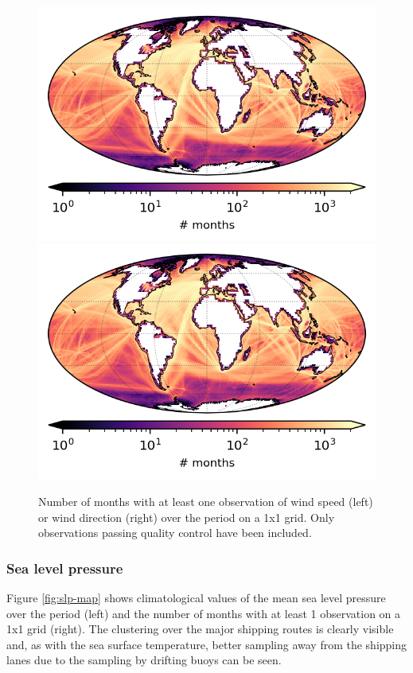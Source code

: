 \begin{figure}[h]
    \centering
    \includegraphics{resources/observations-ws-months-map-optimal.png}
    \includegraphics{resources/observations-wd-months-map-optimal.png}
    \caption{Number of months with at least one observation of wind speed (left) or wind direction (right) over the period \datatimerange{} on a 1x1 grid. Only observations passing quality control have been included.\\}
    \label{fig:wspd-nmonths-map}
\end{figure}

\FloatBarrier
\subsubsection{Sea level pressure}

Figure \ref{fig:slp-map} shows climatological values of the mean sea level pressure over the period \datatimerange{} (left) and the number of months with at least 1 observation on a 1x1 grid (right).
The clustering over the major shipping routes is clearly visible and, as with the sea surface temperature, better sampling away from the shipping lanes due to the sampling by drifting buoys can be seen.

